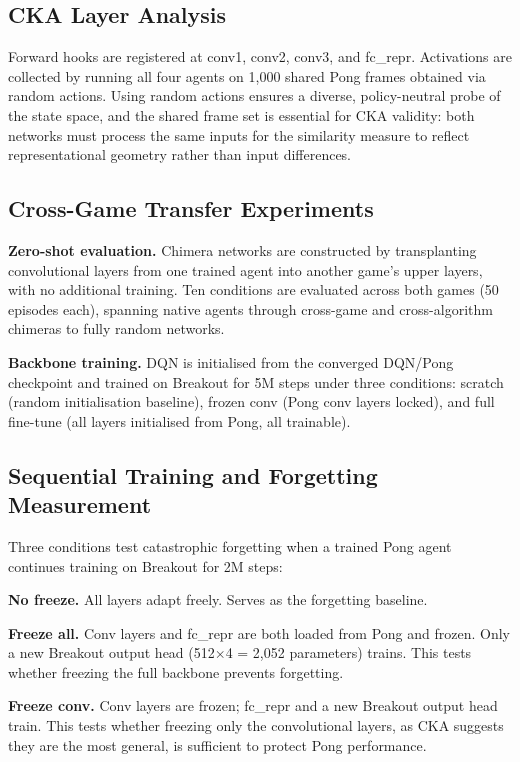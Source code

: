 \documentclass[a4paper]{article}
\begin{document}
\subsection{CKA Layer Analysis}

Forward hooks are registered at conv1, conv2, conv3, and fc\_repr. Activations are collected by running all four agents on 1,000 shared Pong frames obtained via random actions. Using random actions ensures a diverse, policy-neutral probe of the state space, and the shared frame set is essential for CKA validity: both networks must process the same inputs for the similarity measure to reflect representational geometry rather than input differences.

\subsection{Cross-Game Transfer Experiments}

\textbf{Zero-shot evaluation.} Chimera networks are constructed by transplanting convolutional layers from one trained agent into another game's upper layers, with no additional training. Ten conditions are evaluated across both games (50 episodes each), spanning native agents through cross-game and cross-algorithm chimeras to fully random networks.

\textbf{Backbone training.} DQN is initialised from the converged DQN/Pong checkpoint and trained on Breakout for 5M steps under three conditions: scratch (random initialisation baseline), frozen conv (Pong conv layers locked), and full fine-tune (all layers initialised from Pong, all trainable).

\subsection{Sequential Training and Forgetting Measurement}

Three conditions test catastrophic forgetting when a trained Pong agent continues training on Breakout for 2M steps:

\textbf{No freeze.} All layers adapt freely. Serves as the forgetting baseline.

\textbf{Freeze all.} Conv layers and fc\_repr are both loaded from Pong and frozen. Only a new Breakout output head (512$\times$4 = 2,052 parameters) trains. This tests whether freezing the full backbone prevents forgetting.

\textbf{Freeze conv.} Conv layers are frozen; fc\_repr and a new Breakout output head train. This tests whether freezing only the convolutional layers, as CKA suggests they are the most general, is sufficient to protect Pong performance.
\end{document}
